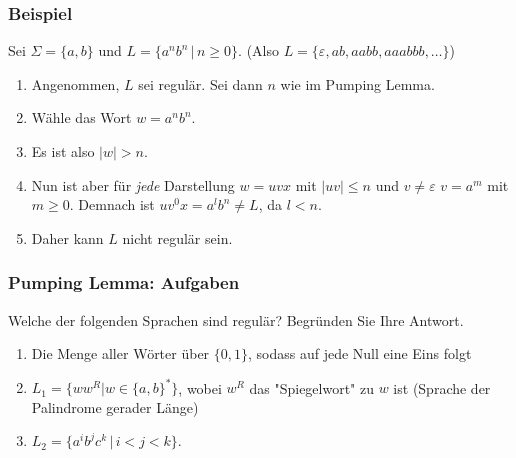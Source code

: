 \begin{frame}
\frametitle{Beispiel}
Sei $\Sigma = \{a, b\}$ und $L = \{a^nb^n\,|\,n\geq0\}$. (Also $L = \{\varepsilon,ab, aabb, aaabbb, \ldots\}$)
\begin{enumerate}
\item Angenommen, $L$ sei regulär. Sei dann $n$ wie im Pumping Lemma.
\item Wähle das Wort $w = a^nb^n$.
\item Es ist also $\left|w\right| > n$.
\item Nun ist aber für \emph{jede} Darstellung $w = uvx$ mit $\left|uv\right| \leq n$ und $v \neq \varepsilon$ $v = a^m$ mit $m \geq 0$. Demnach ist $uv^0x = a^lb^n \neq L$, da $l < n$.
\item Daher kann $L$ nicht regulär sein.
\end{enumerate}

\end{frame}

\begin{frame}
\frametitle{Pumping Lemma: Aufgaben}
Welche der folgenden Sprachen sind regulär? Begründen Sie Ihre Antwort.

\begin{enumerate}
\item Die Menge aller Wörter über $\{0, 1\}$, sodass auf jede Null eine Eins folgt
\item $L_1 = \{ww^R | w \in \{a,b\}^*\}$, wobei $w^R$ das "Spiegelwort" zu $w$ ist (Sprache der Palindrome gerader Länge)
\item $L_2 = \{a^ib^jc^k \, | \, i < j < k\}$.
\end{enumerate}

\end{frame}

